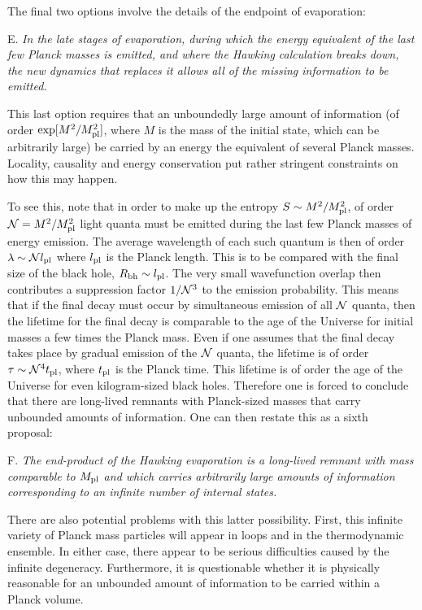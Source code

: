 The final two options involve the details of the endpoint of evaporation:

\item{E.}  {\it In the late stages of evaporation, during which the energy
equivalent of the last
few Planck masses is emitted, and where the Hawking calculation breaks down,
the new dynamics that replaces it
allows all of the missing information to be
emitted. }

This last option requires that an unboundedly large amount of
information (of order $\exp[{M^2/M_{\rm pl}^2}]$, where $M$
is the mass of the
initial state, which can be arbitrarily large) be
carried by an energy the equivalent of several Planck
masses.  Locality, causality and energy conservation put rather
stringent constraints on how this may happen.

To see this, note that in order to make up the entropy
$S\sim M^2/M_{\rm pl}^2$, of order ${\cal N} = M^2/M_{\rm pl}^2$ light quanta must
be emitted during the last few Planck masses of energy emission.  The
average wavelength of each such quantum is then of order $\lambda\sim
{\cal N}l_{\rm pl}$ where $l_{\rm pl}$ is the Planck length.  This is to be compared
with the final size of the black hole, $R_{\rm bh}\sim l_{\rm pl}$.  The
very small wavefunction overlap then contributes a suppression factor
$1/{\cal N}^3$ to the emission probability.  This means that if the final
decay must occur by simultaneous emission of all ${\cal N}$ quanta, then
the lifetime for the final decay is comparable to the age of the
Universe  for initial masses a few times the Planck
mass.  Even if one assumes that the final decay takes place by
gradual emission of the ${\cal N}$ quanta, the lifetime is of
order
$\tau \sim {\cal N}^4 t_{\rm pl}$, where $t_{\rm pl}$ is the Planck
time.  This lifetime is of order the age of the Universe for
even kilogram-sized black holes.
Therefore one is forced to conclude that there are long-lived
remnants with Planck-sized  masses that carry unbounded amounts of
information.  One can then restate this as a sixth proposal:

\item{F.}  {\it The end-product of the Hawking evaporation is a long-lived
remnant with mass comparable to $M_{\rm pl}$ and which carries arbitrarily
large amounts of information corresponding to an infinite number
of internal states.}

There are also potential problems with this latter possibility.
First, this infinite variety of Planck mass particles will appear in loops
and in the thermodynamic ensemble.  In either case, there appear to be serious
difficulties
caused by the infinite degeneracy.
Furthermore, it is questionable whether it is physically
reasonable for an unbounded amount of information to be carried
within a Planck volume.

